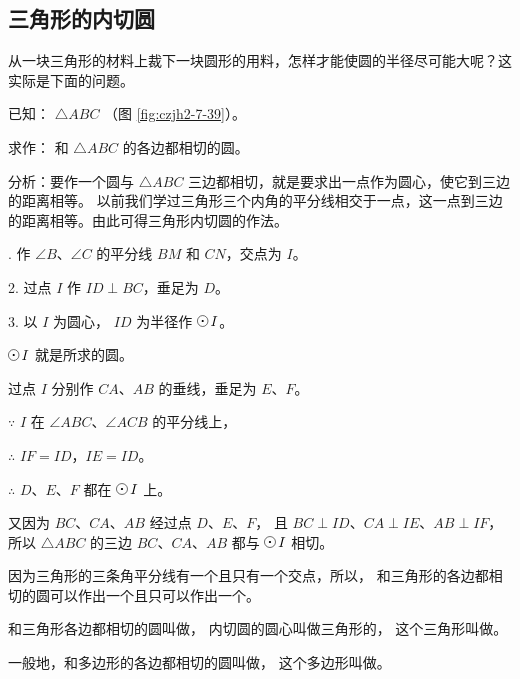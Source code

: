 \subsection{三角形的内切圆}\label{subsec:czjh2-7-10}

从一块三角形的材料上裁下一块圆形的用料，怎样才能使圆的半径尽可能大呢？这实际是下面的问题。


已知： $\triangle ABC$ （图 \ref{fig:czjh2-7-39}）。

求作： 和 $\triangle ABC$ 的各边都相切的圆。

分析：要作一个圆与  $\triangle ABC$ 三边都相切，就是要求出一点作为圆心，使它到三边的距离相等。
以前我们学过三角形三个内角的平分线相交于一点，这一点到三边的距离相等。由此可得三角形内切圆的作法。

. 作 $\angle B$、$\angle C$ 的平分线 $BM$ 和 $CN$，交点为 $I$。

2. 过点 $I$ 作 $ID \perp BC$，垂足为 $D$。

3. 以 $I$ 为圆心， $ID$ 为半径作 $\yuan\,I$。

$\yuan\,I$ 就是所求的圆。

\zhengming 过点 $I$ 分别作 $CA$、$AB$ 的垂线，垂足为 $E$、$F$。

$\because$ \quad  $I$ 在 $\angle ABC$、$\angle ACB$ 的平分线上，

$\therefore$ \quad $IF = ID$，$IE = ID$。

$\therefore$ \quad $D$、$E$、$F$ 都在 $\yuan\,I$ 上。

又因为 $BC$、$CA$、$AB$ 经过点 $D$、$E$、$F$， 且 $BC \perp ID$、$CA \perp IE$、$AB \perp IF$，
所以 $\triangle ABC$ 的三边 $BC$、$CA$、$AB$ 都与 $\yuan\,I$ 相切。

因为三角形的三条角平分线有一个且只有一个交点，所以，
和三角形的各边都相切的圆可以作出一个且只可以作出一个。

和三角形各边都相切的圆叫做，
内切圆的圆心叫做三角形的，
这个三角形叫做。

一般地，和多边形的各边都相切的圆叫做，
这个多边形叫做。

\begin{figure}[htbp]
    \centering
    \begin{minipage}[b]{7cm}
        \centering
        
        \caption{}\label{fig:czjh2-7-39}
    \end{minipage}
    \qquad
    \begin{minipage}[b]{7cm}
        \centering
        
        \caption{}\label{fig:czjh2-7-40}
    \end{minipage}
\end{figure}

